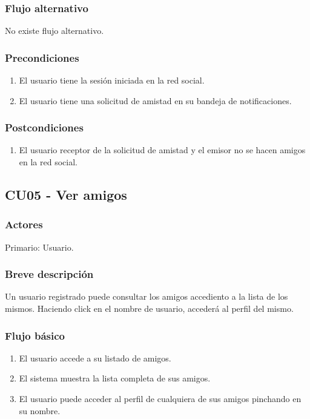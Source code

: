 \documentclass[12pt, a4paper, titlepage]{article}
\begin{document}
\subsubsection{Flujo alternativo}
No existe flujo alternativo.
\subsubsection{Precondiciones}
\begin{enumerate}
	\item El usuario tiene la sesión iniciada en la red social.
	\item El usuario tiene una solicitud de amistad en su bandeja de notificaciones.
\end{enumerate}
\subsubsection{Postcondiciones}
\begin{enumerate}
	\item El usuario receptor de la solicitud de amistad y el emisor no se hacen amigos en la red social.
\end{enumerate}


\subsection{CU05 - Ver amigos}
\subsubsection{Actores}
Primario: Usuario.
\subsubsection{Breve descripción}
Un usuario registrado puede consultar los amigos accediento a la lista de los mismos. Haciendo click en el nombre de usuario, accederá al perfil del mismo.
\subsubsection{Flujo básico}
\begin{enumerate}
	\item El usuario accede a su listado de amigos.
	\item El sistema muestra la lista completa de sus amigos.
	\item El usuario puede acceder al perfil de cualquiera de sus amigos pinchando en su nombre.
\end{enumerate}
\end{document}
